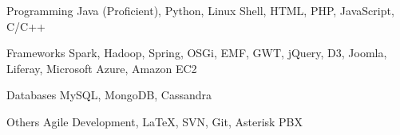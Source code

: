 

\begin{cvskills}

  \cvskill
    {Programming} %
    {Java (Proficient), Python, Linux Shell, HTML, PHP, JavaScript, C/C++} %

  \cvskill
    {Frameworks} %
    {Spark, Hadoop, Spring, OSGi, EMF, GWT, jQuery, D3, Joomla, Liferay, Microsoft Azure, Amazon EC2} %

  \cvskill
    {Databases} %
    {MySQL, MongoDB, Cassandra} %


  \cvskill
  {Others} %
  {Agile Development, {\LaTeX}, SVN, Git, Asterisk PBX} %
  
\end{cvskills}


